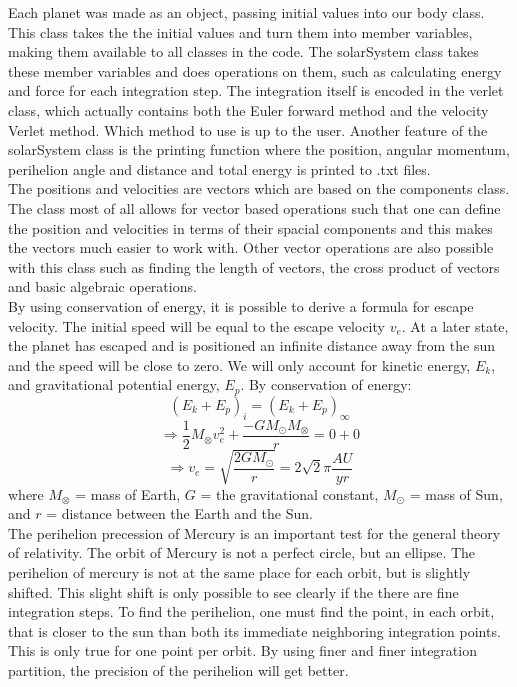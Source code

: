 \documentclass[10pt,a4paper]{article}
\begin{document}
\noindent Each planet was made as an object, passing initial values into our body class. This class takes the the initial values and turn them into member variables, making them available to all classes in the code. The solarSystem class takes these member variables and does operations on them, such as calculating energy and force for each integration step. The integration itself is encoded in the verlet class, which actually contains both the Euler forward method and the velocity Verlet method. Which method to use is up to the user. Another feature of the solarSystem class is the printing function where the position, angular momentum, perihelion angle and distance and total energy is printed to .txt files.\\


\noindent The positions and velocities are vectors which are based on the components class. The class most of all allows for vector based operations such that one can define the position and velocities in terms of their spacial components and this makes the vectors much easier to work with. Other vector operations are also possible with this class such as finding the length of vectors, the cross product of vectors and basic algebraic operations.\\

\noindent By using conservation of energy, it is possible to derive a formula for escape velocity. The initial speed will be equal to the escape velocity $v_e$. At a later state, the planet has escaped and is positioned an infinite distance away from the sun and the speed will be close to zero. We will only account for kinetic energy, $E_k$, and gravitational potential energy, $E_p$. By conservation of energy: 
$$(E_k+E_p)_i = (E_k+E_p)_{\infty}$$
$$\Rightarrow \frac{1}{2}M_{\otimes}v_e^2 + \frac{-GM_{\odot}M_{\otimes}}{r} = 0 + 0$$
$$\Rightarrow v_e = \sqrt{\frac{2GM_{\odot}}{r}} = 2\sqrt{2}\pi \frac{AU}{yr}$$
where $M_{\otimes}$ = mass of Earth, $G$ = the gravitational constant, $M_{\odot}$ = mass of Sun, and $r$ = distance between the Earth and the Sun.\\


\noindent The perihelion precession of Mercury is an important test for the general theory of relativity. The orbit of Mercury is not a perfect circle, but an ellipse. The perihelion of mercury is not at the same place for each orbit, but is slightly shifted. This slight shift is only possible to see clearly if the there are fine integration steps. To find the perihelion, one must find the point, in each orbit, that is closer to the sun than both its immediate neighboring integration points. This is only true for one point per orbit. By using finer and finer integration partition, the precision of the perihelion will get better.   
\end{document}
